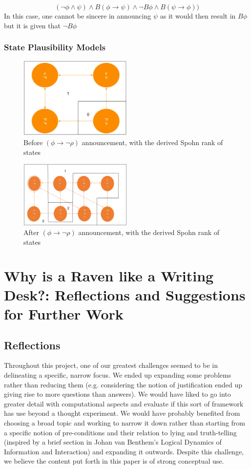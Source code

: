 \documentclass[12pt, titlepage, twoside, a4paper]{report}
\begin{document}
$$(\neg \phi \wedge \psi) \wedge B(\phi \to \psi) \wedge \neg B \phi \wedge B(\psi \to \phi))$$
In this case, one cannot be sincere in announcing $\psi$ as it would then result in $B\phi$ but it is given that $\neg B \phi$
\newpage
\subsection{State Plausibility Models}
\quad
\newline
\begin{figure}[h!]
  \centering
  \includegraphics[width=0.5\textwidth]{slide34.eps}
  \caption{Before $(\phi \to \neg \rho)$ announcement, with the derived Spohn rank of states}
\end{figure}
\begin{figure}[h!]
  \centering
  \includegraphics[width=0.5\textwidth]{slide36.eps}
  \caption{After $(\phi \to \neg \rho)$ announcement, with the derived Spohn rank of states}
\end{figure}
\quad
\newline

\chapter{Why is a Raven like a Writing Desk?: Reflections and Suggestions for Further Work}
\section{Reflections}
Throughout this project, one of our greatest challenges seemed to be in delineating a specific, narrow focus. We ended up expanding some problems rather than reducing them (e.g. considering the notion of justification ended up giving rise to more questions than answers). We would have liked to go into greater detail with computational aspects and evaluate if this sort of framework has use beyond a thought experiment. We would have probably benefited from choosing a broad topic and working to narrow it down rather than starting from a specific notion of pre-conditions and their relation to lying and truth-telling (inspired by a brief section in Johan van Benthem’s Logical Dynamics of Information and Interaction)\autocite{BenthemJohanvan2011Ldoi} and expanding it outwards. Despite this challenge, we believe the content put forth in this paper is of strong conceptual use.
\newpage
\end{document}

